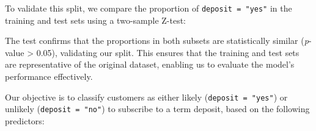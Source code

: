 \documentclass[
  11pt,
]{book}
\makeatletter
\newenvironment{Shaded}{}{}
\newcommand{\AttributeTok}[1]{#1}
\newcommand{\ControlFlowTok}[1]{\textcolor[rgb]{0.07,0.07,0.07}{#1}}
\newcommand{\DecValTok}[1]{#1}
\newcommand{\FloatTok}[1]{#1}
\newcommand{\FunctionTok}[1]{#1}
\newcommand{\NormalTok}[1]{#1}
\newcommand{\OtherTok}[1]{\textcolor[rgb]{0.39,0.39,0.39}{#1}}
\newcommand{\SpecialCharTok}[1]{\textcolor[rgb]{0.39,0.39,0.39}{#1}}
\newcommand{\StringTok}[1]{\textcolor[rgb]{0.39,0.39,0.39}{#1}}
\newenvironment{kframe}{%
\medskip{}
\setlength{\fboxsep}{.8em}
 \def\at@end@of@kframe{}%
 \ifinner\ifhmode%
  \def\at@end@of@kframe{\end{minipage}}%
  \begin{minipage}{\columnwidth}%
 \fi\fi%
 \def\FrameCommand##1{\hskip\@totalleftmargin \hskip-\fboxsep
 \colorbox{shadecolor}{##1}\hskip-\fboxsep
     \hskip-\linewidth \hskip-\@totalleftmargin \hskip\columnwidth}%
 \MakeFramed {\advance\hsize-\width
   \@totalleftmargin\z@ \linewidth\hsize
   \@setminipage}}%
 {\par\unskip\endMakeFramed%
 \at@end@of@kframe}
\renewenvironment{Shaded}{\begin{kframe}}{\end{kframe}}
\theoremstyle{definition}
\theoremstyle{definition}
\theoremstyle{definition}
\theoremstyle{definition}
\theoremstyle{remark}
\makeatother
\begin{document}
To validate this split, we compare the proportion of \texttt{deposit\ =\ "yes"} in the training and test sets using a two-sample Z-test:

\begin{Shaded}
\end{Shaded}

The test confirms that the proportions in both subsets are statistically similar (\emph{p}-value \textgreater{} 0.05), validating our split. This ensures that the training and test sets are representative of the original dataset, enabling us to evaluate the model's performance effectively.

Our objective is to classify customers as either likely (\texttt{deposit\ =\ "yes"}) or unlikely (\texttt{deposit\ =\ "no"}) to subscribe to a term deposit, based on the following predictors:
\end{document}
